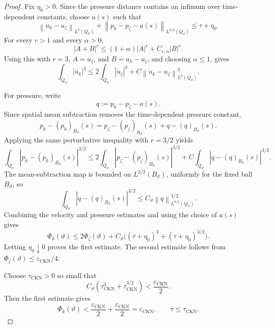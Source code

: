 \documentclass[10pt,a4paper]{amsart}
\newcommand{\norm}[1]{\left\lVert #1\right\rVert}
\begin{document}
\begin{proof}
Fix \(\eta_0>0\).  Since the pressure distance contains an infimum over
time-dependent constants, choose \(a(s)\) such that
\[
  \norm{u_k-u_\zeta}_{L^3(Q_\vartheta)}
  +
  \norm{p_k-p_\zeta-a(s)}_{L^{3/2}(Q_\vartheta)}
  \le
  \tau+\eta_0.
\]
For every \(r>1\) and every \(\alpha>0\),
\[
  |A+B|^r\le (1+\alpha)|A|^r+C_{r,\alpha}|B|^r .
\]
Using this with \(r=3\), \(A=u_\zeta\), and
\(B=u_k-u_\zeta\), and choosing \(\alpha\le1\), gives
\[
  \int_{Q_\vartheta}|u_k|^3
  \le
  2\int_{Q_\vartheta}|u_\zeta|^3
  +
  C\norm{u_k-u_\zeta}_{L^3(Q_\vartheta)}^3.
\]

For pressure, write
\[
  q:=p_k-p_\zeta-a(s).
\]
Since spatial mean subtraction removes the time-dependent pressure constant,
\[
  p_k-(p_k)_{B_\vartheta}(s)
  =
  p_\zeta-(p_\zeta)_{B_\vartheta}(s)
  +
  q-(q)_{B_\vartheta}(s).
\]
Applying the same perturbative inequality with \(r=3/2\) yields
\[
  \int_{Q_\vartheta}|p_k-(p_k)_{B_\vartheta}(s)|^{3/2}
  \le
  2\int_{Q_\vartheta}
  |p_\zeta-(p_\zeta)_{B_\vartheta}(s)|^{3/2}
  +
  C\int_{Q_\vartheta}|q-(q)_{B_\vartheta}(s)|^{3/2}.
\]
The mean-subtraction map is bounded on \(L^{3/2}(B_\vartheta)\), uniformly for
the fixed ball \(B_\vartheta\), so
\[
  \int_{Q_\vartheta}|q-(q)_{B_\vartheta}(s)|^{3/2}
  \le
  C_\vartheta\norm{q}_{L^{3/2}(Q_\vartheta)}^{3/2}.
\]
Combining the velocity and pressure estimates and using the choice of
\(a(s)\) gives
\[
  \Phi_k(\vartheta)
  \le
  2\Phi_\zeta(\vartheta)
  +
  C_\vartheta\bigl((\tau+\eta_0)^3+(\tau+\eta_0)^{3/2}\bigr).
\]
Letting \(\eta_0\downarrow0\) proves the first estimate.  The second estimate
follows from \(\Phi_\zeta(\vartheta)\le\varepsilon_{\mathrm{CKN}}/4\).

Choose \(\tau_{\mathrm{CKN}}>0\) so small that
\[
  C_\vartheta
  \left(
  \tau_{\mathrm{CKN}}^3+\tau_{\mathrm{CKN}}^{3/2}
  \right)
  <
  \frac{\varepsilon_{\mathrm{CKN}}}{2}.
\]
Then the first estimate gives
\[
  \Phi_k(\vartheta)
  <
  \frac{\varepsilon_{\mathrm{CKN}}}{2}
  +
  \frac{\varepsilon_{\mathrm{CKN}}}{2}
  =
  \varepsilon_{\mathrm{CKN}},
  \qquad
  \tau\le\tau_{\mathrm{CKN}}.
\]
\end{proof}
\end{document}
